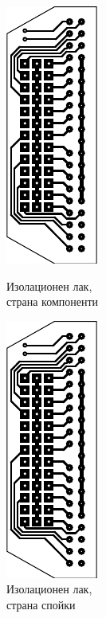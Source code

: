 \begin{figure}[!htbp]
    \begin{minipage}{0.49\linewidth}
        \centering
        \includegraphics[page=5]{documents/pata_board.pdf}
        \caption{Изолационен лак,\\страна компоненти}
        \label{fig:pata_top_res}
    \end{minipage}
    \hfill
    \begin{minipage}{0.49\linewidth}
        \centering
        \includegraphics[page=6]{documents/pata_board.pdf}
        \caption{Изолационен лак,\\страна спойки}
        \label{fig:pata_bot_res}
    \end{minipage}
\end{figure}
